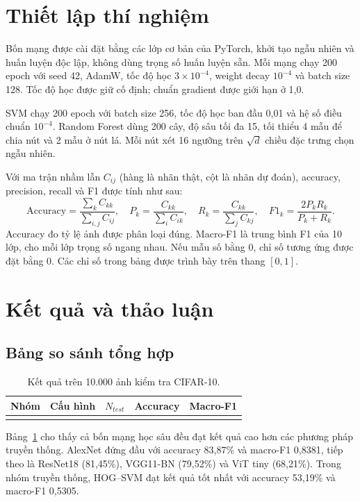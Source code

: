 \documentclass[10pt,a4paper]{article}
\begin{document}


\section{Thiết lập thí nghiệm}
Bốn mạng được cài đặt bằng các lớp cơ bản của PyTorch, khởi tạo ngẫu nhiên
và huấn luyện độc lập, không dùng trọng số huấn luyện sẵn.
Mỗi mạng chạy 200 epoch với seed 42, AdamW, tốc độ học $3\times10^{-4}$,
weight decay $10^{-4}$ và batch size 128. Tốc độ học được giữ cố định;
chuẩn gradient được giới hạn ở 1,0.

SVM chạy 200 epoch với batch size 256, tốc độ học ban đầu 0,01
và hệ số điều chuẩn $10^{-4}$. Random Forest dùng 200 cây, độ sâu tối đa 15,
tối thiểu 4 mẫu để chia nút và 2 mẫu ở nút lá. Mỗi nút xét 16 ngưỡng trên
$\sqrt{d}$ chiều đặc trưng chọn ngẫu nhiên. 

Với ma trận nhầm lẫn $C_{ij}$ (hàng là nhãn thật, cột là nhãn dự đoán),
accuracy, precision, recall và F1 được tính như sau:
\begin{equation}
 \mathrm{Accuracy}=\frac{\sum_k C_{kk}}{\sum_{i,j}C_{ij}},\quad
 P_k=\frac{C_{kk}}{\sum_i C_{ik}},\quad
 R_k=\frac{C_{kk}}{\sum_j C_{kj}},\quad
 F1_k=\frac{2P_kR_k}{P_k+R_k}.
\end{equation}
Accuracy đo tỷ lệ ảnh được phân loại đúng. Macro-F1 là trung bình F1 của
10 lớp, cho mỗi lớp trọng số ngang nhau. Nếu mẫu số bằng 0, chỉ số tương ứng được đặt bằng 0.
Các chỉ số trong bảng được trình bày trên thang $[0,1]$.

\section{Kết quả và thảo luận}
\subsection{Bảng so sánh tổng hợp}
\begin{table}[H]
\centering
\caption{Kết quả trên 10.000 ảnh kiểm tra CIFAR-10.}
\label{tab:results}
\begin{tabular}{llrrr}
\toprule
Nhóm & Cấu hình & $N_{test}$ & Accuracy & Macro-F1 \\
\midrule
 \\
\bottomrule
\end{tabular}
\end{table}

Bảng~\ref{tab:results} cho thấy cả bốn mạng học sâu đều đạt kết quả cao hơn
các phương pháp truyền thống. AlexNet đứng đầu với accuracy 83,87\% và
macro-F1 0,8381, tiếp theo là ResNet18 (81,45\%), VGG11-BN (79,52\%) và
ViT tiny (68,21\%). Trong nhóm truyền thống, HOG--SVM đạt kết quả tốt nhất
với accuracy 53,19\% và macro-F1 0,5305.
\end{document}

